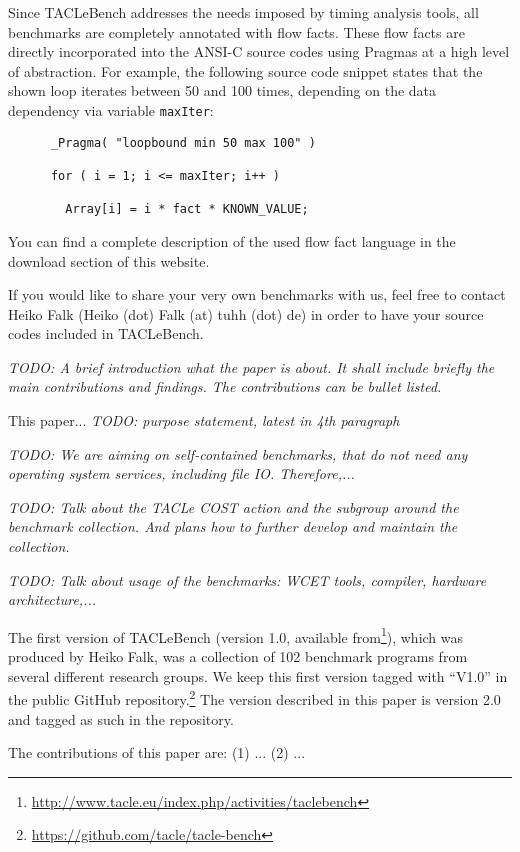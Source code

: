 \documentclass[a4paper,UKenglish]{oasics}
\newcommand{\todo}[1]{{\emph{TODO: #1}}}
\newcommand{\code}[1]{{\small{\texttt{#1}}}}
\begin{document}
    Since TACLeBench addresses the needs imposed by timing analysis tools, all benchmarks are completely annotated with flow facts. These flow facts are directly incorporated into the ANSI-C source codes using Pragmas at a high level of abstraction. For example, the following source code snippet states that the shown loop iterates between 50 and 100 times, depending on the data dependency via variable \code{maxIter}:

\begin{verbatim}
      _Pragma( "loopbound min 50 max 100" )

      for ( i = 1; i <= maxIter; i++ )

        Array[i] = i * fact * KNOWN_VALUE;

\end{verbatim}
    You can find a complete description of the used flow fact language in the download section of this website.

    If you would like to share your very own benchmarks with us, feel free to contact Heiko Falk (Heiko (dot) Falk (at) tuhh (dot) de) in order to have your source codes included in TACLeBench.

\todo{A brief introduction what the paper is about. It shall include briefly the
main contributions and findings. The contributions can be bullet listed.}

This paper... \todo{purpose statement, latest in 4th paragraph}

\todo{We are aiming on self-contained benchmarks, that do not need any
operating system services, including file IO. Therefore,...}

\todo{Talk about the TACLe COST action and the subgroup around the benchmark
collection. And plans how to further develop and maintain the collection.}

\todo{Talk about usage of the benchmarks: WCET tools, compiler, hardware
architecture,...}

The first version of TACLeBench (version 1.0, available
from\footnote{\url{http://www.tacle.eu/index.php/activities/taclebench}}), which was produced
by Heiko Falk, was a collection of 102 benchmark programs from several different
research groups. We keep this first version tagged with ``V1.0'' in the public
GitHub repository.\footnote{\url{https://github.com/tacle/tacle-bench}}
The version described in this paper is version 2.0 and tagged as such in the
repository.

The contributions of this paper are: (1) ... (2) ...
\end{document}

